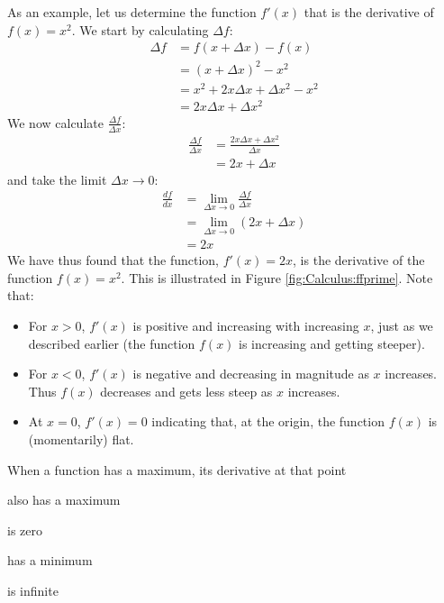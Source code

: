 As an example, let us determine the function $f'(x)$ that is the derivative of $f(x)=x^2$. We start by calculating $\Delta f$:
\begin{align*}
\Delta f &= f(x+\Delta x)-f(x)\\
&=(x+\Delta x)^2 - x^2\\
&=x^2+2x\Delta x+\Delta x^2 -x^2\\
&=2x\Delta x+\Delta x^2
\end{align*}
We now calculate $\frac{\Delta f}{\Delta x}$:
\begin{align*}
\frac{\Delta f}{\Delta x}&=\frac{2x\Delta x+\Delta x^2}{\Delta x}\\
&=2x+\Delta x
\end{align*}
and take the limit $\Delta x\to 0$:
\begin{align*}
\frac{df}{dx}&=\lim_{\Delta x\to 0 }\frac{\Delta f}{\Delta x}\\
&=\lim_{\Delta x\to 0 }(2x+\Delta x)\\
&=2x
\end{align*}
We have thus found that the function, $f'(x)=2x$, is the derivative of the function $f(x)=x^2$. This is illustrated in Figure \ref{fig:Calculus:ffprime}. Note that:
\begin{itemize}
\item For $x>0$, $f'(x)$ is positive and increasing with increasing $x$, just as we described earlier (the function $f(x)$ is increasing and getting steeper).
\item For $x<0$, $f'(x)$ is negative and decreasing in magnitude as $x$ increases. Thus $f(x)$ decreases and gets less steep as $x$ increases.
\item At $x=0$, $f'(x)=0$ indicating that, at the origin, the function $f(x)$ is (momentarily) flat.
\end{itemize}   


\begin{checkpoint}
\begin{MCquestion}{When a function has a maximum, its derivative at that point}
\item also has a maximum
\item is zero \correct
\item has a minimum
\item is infinite
\end{MCquestion}
\end{checkpoint}


